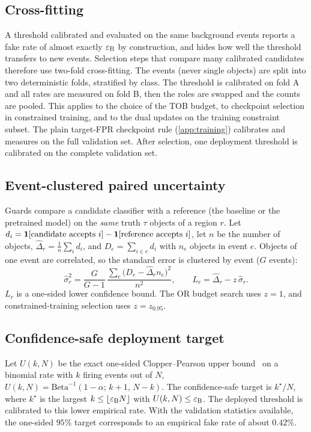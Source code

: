 \subsection{Cross-fitting}
A threshold calibrated and evaluated on the same background events reports a fake rate of almost exactly $\varepsilon_{\mathrm{B}}$ by construction, and hides how well the threshold transfers to new events. Selection steps that compare many calibrated candidates therefore use two-fold cross-fitting. The events (never single objects) are split into two deterministic folds, stratified by class. The threshold is calibrated on fold A and all rates are measured on fold B, then the roles are swapped and the counts are pooled. This applies to the choice of the TOB budget, to checkpoint selection in constrained training, and to the dual updates on the training constraint subset. The plain target-FPR checkpoint rule (\cref{app:training}) calibrates and measures on the full validation set. After selection, one deployment threshold is calibrated on the complete validation set.

\subsection{Event-clustered paired uncertainty}
Guards compare a candidate classifier with a reference (the baseline or the pretrained model) on the \emph{same} truth $\tau$ objects of a region $r$. Let $d_i=\mathbf{1}[\text{candidate accepts }i]-\mathbf{1}[\text{reference accepts }i]$, let $n$ be the number of objects, $\hat\Delta_r=\frac1n\sum_i d_i$, and $D_e=\sum_{i\in e}d_i$ with $n_e$ objects in event $e$. Objects of one event are correlated, so the standard error is clustered by event ($G$ events):
\begin{equation}
  \hat\sigma_r^2=\frac{G}{G-1}\,\frac{\sum_e\big(D_e-\hat\Delta_r n_e\big)^2}{n^2},
  \qquad L_r=\hat\Delta_r-z\,\hat\sigma_r .
\end{equation}
$L_r$ is a one-sided lower confidence bound. The OR budget search uses $z=1$, and constrained-training selection uses $z=z_{0.95}$.

\subsection{Confidence-safe deployment target}
Let $U(k,N)$ be the exact one-sided Clopper--Pearson upper bound~\cite{clopper1934} on a binomial rate with $k$ firing events out of $N$, $U(k,N)=\mathrm{Beta}^{-1}(1-\alpha;\,k+1,\,N-k)$. The confidence-safe target is $k^\star/N$, where $k^\star$ is the largest $k\leq\lfloor\varepsilon_{\mathrm{B}} N\rfloor$ with $U(k,N)\leq\varepsilon_{\mathrm{B}}$. The deployed threshold is calibrated to this lower empirical rate. With the validation statistics available, the one-sided $95\%$ target corresponds to an empirical fake rate of about $0.42\%$.

